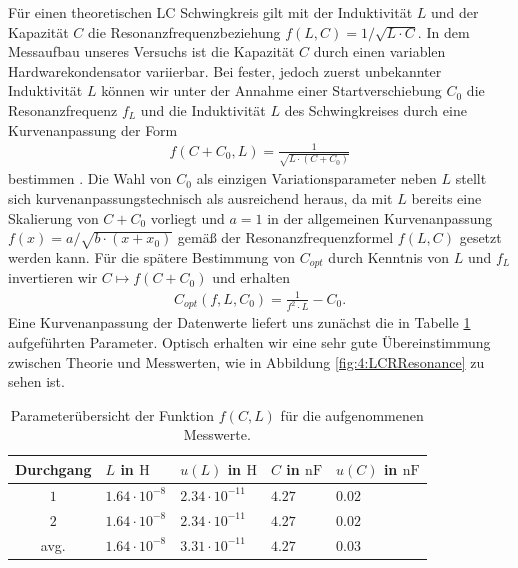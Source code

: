\documentclass{article}
\begin{document}
        Für einen theoretischen LC Schwingkreis gilt mit der Induktivität $L$ und der Kapazität $C$ die Resonanzfrequenzbeziehung $f(L,C) = 1/\sqrt{L\cdot C}$. In dem Messaufbau unseres Versuchs ist die Kapazität $C$ durch einen variablen Hardwarekondensator variierbar. Bei fester, jedoch zuerst unbekannter Induktivität $L$ können wir unter der Annahme einer Startverschiebung $C_0$ die Resonanzfrequenz $f_L$ und die Induktivität $L$ des Schwingkreises durch eine Kurvenanpassung der Form 
        \begin{align}
            f(C + C_0,L) = \frac{1}{\sqrt{L\cdot (C + C_0)}}
        \end{align}
        bestimmen \cite[ch 1.4.3]{doc:EFNMRStudentManual}. Die Wahl von $C_0$ als einzigen Variationsparameter neben $L$ stellt sich kurvenanpassungstechnisch als ausreichend heraus, da mit $L$ bereits eine Skalierung von $C + C_0$ vorliegt und $a=1$ in der allgemeinen Kurvenanpassung $f(x) = a / \sqrt{b\cdot (x + x_0)}$ gemäß der Resonanzfrequenzformel $f(L,C)$ gesetzt werden kann.
        Für die spätere Bestimmung von $C_{opt}$ durch Kenntnis von $L$ und $f_L$ invertieren wir $C\mapsto f(C + C_0)$ und erhalten 
        \begin{align}
            C_{opt}(f,L,C_0) = \frac{1}{f^2\cdot L} - C_0. \label{eq:4:Capacitance}
        \end{align}
        Eine Kurvenanpassung der Datenwerte liefert uns zunächst die in Tabelle \ref{tab:4:LCRResonance} aufgeführten Parameter. Optisch erhalten wir eine sehr gute Übereinstimmung zwischen Theorie und Messwerten, wie in Abbildung \ref{fig:4:LCRResonance} zu sehen ist.
        \begin{table}[H]
            \centering
            \begin{tabular}{c|ll|ll}
                 \textbf{Durchgang} & $L$ in $\si{\henry}$ & $u(L)$ in $\si{\henry}$ & $C$ in $\si{\nano\farad}$ & $u(C)$ in $\si{\nano\farad}$ \\
                \hline
                $1$ & $1.64\cdot 10^{-8}$ & $2.34\cdot 10^{-11}$ & $4.27$ & $0.02$ \\
                $2$ & $1.64\cdot 10^{-8}$ & $2.34\cdot 10^{-11}$ & $4.27$ & $0.02$ \\
                \hline
                avg. & $1.64\cdot 10^{-8}$ & $3.31\cdot 10^{-11}$ & $4.27$ & $0.03$
            \end{tabular} 
            \caption{Parameterübersicht der Funktion $f(C,L)$ für die aufgenommenen Messwerte.}
            \label{tab:4:LCRResonance}
        \end{table}
\end{document}
